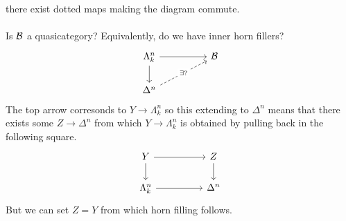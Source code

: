 there exist dotted maps making the diagram commute. 
\\\\
Is $\mathcal{B}$ a quasicategory? Equivalently, do we have inner horn fillers? 
$$%
\begin{tikzcd}
	{\Lambda^{n}_{k}} && \Bcal \\
	{\Delta^{n}}
	\arrow[from=1-1, to=1-3]
	\arrow[from=1-1, to=2-1]
	\arrow["{\exists?}"{description}, dashed, from=2-1, to=1-3]
\end{tikzcd}$$
The top arrow corresonds to $Y\to\Lambda^{n}_{k}$ so this extending to $\Delta^{n}$ means that there exists some $Z\to\Delta^{n}$ from which $Y\to\Lambda^{n}_{k}$ is obtained by pulling back in the following square. 
$$%
\begin{tikzcd}
	Y && Z \\
	{\Lambda^{n}_{k}} && {\Delta^{n}}
	\arrow[from=1-1, to=1-3]
	\arrow[from=1-3, to=2-3]
	\arrow[from=1-1, to=2-1]
	\arrow[from=2-1, to=2-3]
\end{tikzcd}$$
But we can set $Z=Y$ from which horn filling follows. 

